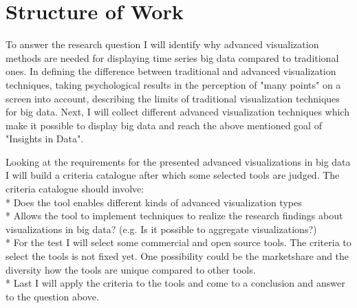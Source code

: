 \section{Structure of Work}
To answer the research question I will identify why advanced visualization methods are needed for displaying time series big data compared to traditional ones.
In defining the difference between traditional and advanced visualization techniques, 
taking psychological results in the perception of "many points" on a screen into account, 
describing the limits of traditional visualization techniques for big data.
Next, I will collect different advanced visualization techniques which make it possible to display big data and reach the above mentioned goal of "Insights in Data". 

Looking at the requirements for the presented advanced visualizations in big data I will build a criteria catalogue after which some selected tools are judged. The criteria catalogue should involve:\\*
Does the tool enables different kinds of advanced visualization types\\*
Allows the tool to implement techniques to realize the research findings about visualizations in big data? (e.g. Is it possible to aggregate visualizations?) \\*
For the test I will select some commercial and open source tools. The criteria to select the tools is not fixed yet. One possibility could be the marketshare and the diversity how the tools are unique compared to other tools.\\*
Last I will apply the criteria to the tools and come to a conclusion and answer to the question above.
